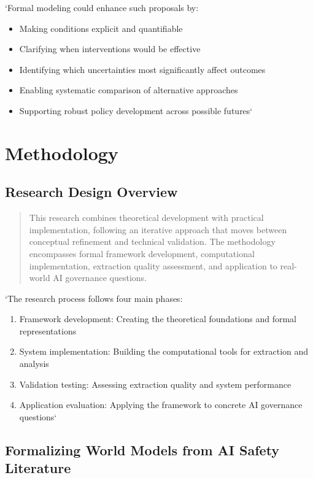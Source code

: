 \documentclass[12pt,a4paper]{report}
\providecommand{\tightlist}{%
  \setlength{\itemsep}{0pt}\setlength{\parskip}{0pt}}
\begin{document}
`Formal modeling could enhance such proposals by:

\begin{itemize}
\tightlist
\item
  Making conditions explicit and quantifiable
\item
  Clarifying when interventions would be effective
\item
  Identifying which uncertainties most significantly affect outcomes
\item
  Enabling systematic comparison of alternative approaches
\item
  Supporting robust policy development across possible futures`
\end{itemize}

\section{Methodology}\label{sec-methodology}

\subsection{Research Design Overview}\label{sec-research-design}

\begin{quote}
This research combines theoretical development with practical
implementation, following an iterative approach that moves between
conceptual refinement and technical validation. The methodology
encompasses formal framework development, computational implementation,
extraction quality assessment, and application to real-world AI
governance questions.
\end{quote}

`The research process follows four main phases:

\begin{enumerate}
\def\labelenumi{\arabic{enumi}.}
\tightlist
\item
  Framework development: Creating the theoretical foundations and formal
  representations
\item
  System implementation: Building the computational tools for extraction
  and analysis
\item
  Validation testing: Assessing extraction quality and system
  performance
\item
  Application evaluation: Applying the framework to concrete AI
  governance questions`
\end{enumerate}

\subsection{Formalizing World Models from AI Safety
Literature}\label{sec-formalizing-world-models}
\end{document}
